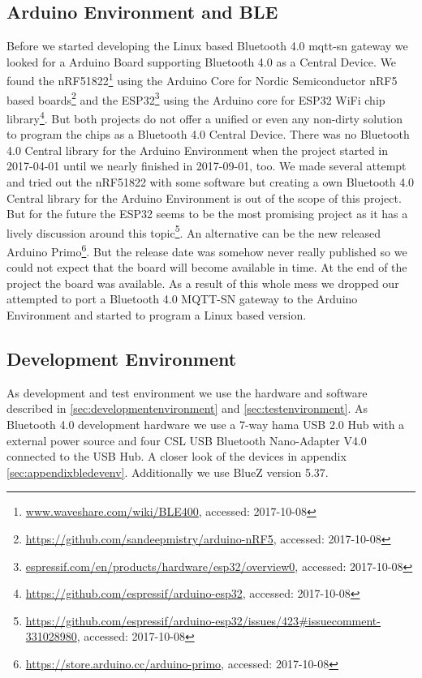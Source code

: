 \subsection{Arduino Environment and BLE}\label{sec:arduinoandble}
Before we started developing the Linux based Bluetooth 4.0 mqtt-sn gateway we looked for a Arduino Board supporting Bluetooth 4.0 as a Central Device.
We found the nRF51822\footnote{\url{www.waveshare.com/wiki/BLE400}, accessed: 2017-10-08} using the Arduino Core for Nordic Semiconductor nRF5 based boards\footnote{\url{https://github.com/sandeepmistry/arduino-nRF5}, accessed: 2017-10-08} and the ESP32\footnote{\url{espressif.com/en/products/hardware/esp32/overview0}, accessed: 2017-10-08} using the Arduino core for ESP32 WiFi chip library\footnote{\url{https://github.com/espressif/arduino-esp32}, accessed: 2017-10-08}.
But both projects do not offer a unified or even any non-dirty solution to program the chips as a Bluetooth 4.0 Central Device.
There was no Bluetooth 4.0 Central library for the Arduino Environment when the project started in 2017-04-01 until we nearly finished in 2017-09-01, too.
We made several attempt and tried out the nRF51822 with some software but creating a own Bluetooth 4.0 Central library for the Arduino Environment is out of the scope of this project.
But for the future the ESP32 seems to be the most promising project as it has a lively discussion around this topic\footnote{\url{https://github.com/espressif/arduino-esp32/issues/423\#issuecomment-331028980}, accessed: 2017-10-08}.
An alternative can be the new released Arduino Primo\footnote{\url{https://store.arduino.cc/arduino-primo}, accessed: 2017-10-08}.
But the release date was somehow never really published so we could not expect that the board will become available in time.
At the end of the project the board was available.
As a result of this whole mess we dropped our attempted to port a Bluetooth 4.0 MQTT-SN gateway to the Arduino Environment and started to program a Linux based version.

\subsection{Development Environment}\label{sec:bledevenv}
As development and test environment we use the hardware and software described in \autoref{sec:developmentenvironment} and \autoref{sec:testenvironment}.
As Bluetooth 4.0 development hardware we use a 7-way hama USB 2.0 Hub with a external power source and four CSL USB Bluetooth Nano-Adapter V4.0 connected to the USB Hub.
A closer look of the devices in appendix \autoref{sec:appendixbledevenv}.
Additionally we use BlueZ version 5.37.
